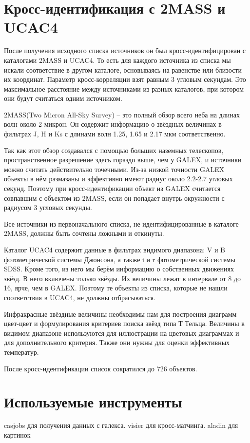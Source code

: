
\section{Кросс-идентификация с 2MASS и UCAC4}
После получения исходного списка источников он был кросс-идентифицирован с каталогами 2MASS и UCAC4. То есть для каждого источника из списка мы искали соответствие в другом каталоге, основываясь на равенстве или близости их координат. Параметр кросс-корреляции взят равным 3 угловым секундам. Это максимальное расстояние между источниками из разных каталогов, при котором они будут считаться одним источником.

2MASS(Two Micron All-Sky Survey) -- это полный обзор всего неба на длинах волн около 2 микрон. Он содержит информацию о звёздных величинах в фильтрах J, H и Ks с длинами волн 1.25, 1.65 и 2.17 мкм соответственно.

Так как  этот обзор создавался с помощью больших наземных телескопов, пространственное разрешение здесь гораздо выше, чем у GALEX, и источники можно считать действительно точечными. Из-за низкой точности GALEX объекты в нём размазаны и эффективно имеют радиус около 2.2-2.7 угловых секунд. Поэтому при кросс-идентификации объект из GALEX считается совпавшим с объектом из 2MASS, если он попадает внутрь окружности с радиусом 3 угловых секунды.

Все источники из первоначального списка, не идентифицированные в каталоге 2MASS, должны быть сочтены ложными и откинуты.

Каталог UCAC4 содержит данные в фильтрах видимого диапазона: V и B фотометрической системы Джонсона, а также i и r фотометрической системы SDSS. Кроме того, из него мы берём информацию о собственных движениях звёзд. В него включены только звёзды. Их величины лежат в интервале от 8 до 16, ярче, чем в GALEX. Поэтому те объекты из списка, которые не нашли соответствия в UCAC4, не должны отбрасываться.

Инфракрасные звёздные величины необходимы нам для построения диаграмм цвет-цвет и формулирования критериев поиска звёзд типа Т Тельца. Величины в видимом диапазоне используются для иллюстрации на цветовых диаграммах и для дополнительного критерия. Также они нужны для оценки эффективных температур.

После кросс-идентификации список сократился до 726 объектов.

\section{Используемые инструменты}
casjobs для получения данных с галекса. visier для кросс-матчинга. aladin для картинок

